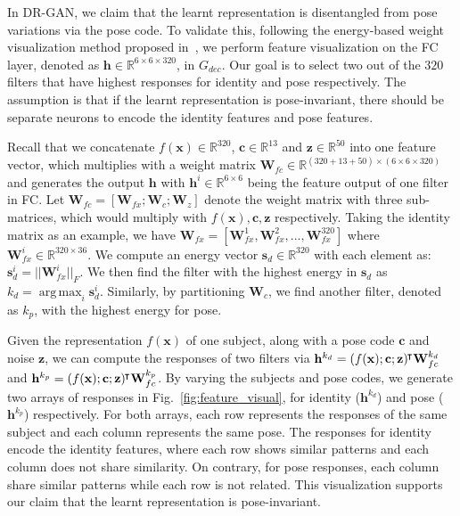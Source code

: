 \documentclass[10pt,journal,compsoc]{IEEEtran}
\begin{document}
\label{sec:ablation_disentangled_representation}
In DR-GAN, we claim that the learnt representation is disentangled from pose variations via the pose code. 
To validate this, following the energy-based weight visualization method proposed in~\cite{yin2017multi}, we perform feature visualization on the FC layer, denoted as $\mathbf{h}\in \mathbb{R}^{ 6\times6\times320}$, in $G_{dec}$.
Our goal is to select two out of the $320$ filters that have highest responses for identity and pose respectively. 
The assumption is that if the learnt representation is pose-invariant, there should be separate neurons to encode the identity features and pose features. 

Recall that we concatenate $f(\mathbf{x})\in \mathbb{R}^{320}$, $\mathbf{c}\in \mathbb{R}^{13}$ and $\mathbf{z}\in\mathbb{R}^{50}$ into one feature vector, which multiplies with a weight matrix $\mathbf{W}_{fc} \in \mathbb{R}^{(320+13+50)\times(6\times6\times320)}$ and generates the output $\mathbf{h}$ with $\mathbf{h}^{i}\in\mathbb{R}^{6\times6}$ being the feature output of one filter in FC. %
Let $\mathbf{W}_{fc} = [\mathbf{W}_{fx}; \mathbf{W}_{c}; \mathbf{W}_{z}]$ denote the weight matrix with three sub-matrices, which would multiply with $f(\mathbf{x}), \mathbf{c}, \mathbf{z}$ respectively. 
Taking the identity matrix as an example, we have $\mathbf{W}_{fx}=[\mathbf{W}_{fx}^1, \mathbf{W}_{fx}^2, ..., \mathbf{W}_{fx}^{320}]$ where $\mathbf{W}_{fx}^i\in\mathbb{R}^{320\times36}$. %
We compute an energy vector $\mathbf{s}_d\in\mathbb{R}^{320}$ with each element as: $\mathbf{s}_{d}^i = || \mathbf{W}_{fx}^i ||_F$.
We then find the filter with the highest energy in $\mathbf{s}_d$ as $k_d =\operatorname*{arg\,max}_i \mathbf{s}_d^i$.
Similarly, by partitioning $\mathbf{W}_c$, we find another filter, denoted as $k_p$, with the highest energy for pose. 

Given the representation $f(\mathbf{x})$ of one subject, along with a pose code $\mathbf{c}$ and noise $\mathbf{z}$, we can compute the responses of two filters via $\mathbf{h}^{k_d} = (f(\mathbf{x}); \mathbf{c}; \mathbf{z})^{\hspace{-1pt}\intercal}\mathbf{W}_{fc}^{k_d}$ and $\mathbf{h}^{k_p} = (f(\mathbf{x}); \mathbf{c}; \mathbf{z})^{\hspace{-1pt}\intercal}\mathbf{W}_{fc}^{k_p}$.
By varying the subjects and pose codes, we generate two arrays of responses in Fig.~\ref{fig:feature_visual}, for identity ($\mathbf{h}^{k_d}$) and pose ($\mathbf{h}^{k_p}$) respectively.
For both arrays, each row represents the responses of the same subject and each column represents the same pose. %
The responses for identity encode the identity features, where each row shows similar patterns and each column does not share similarity. 
On contrary, for pose responses, each column share similar patterns while each row is not related. 
This visualization supports our claim that the learnt representation is pose-invariant. 
\end{document}
